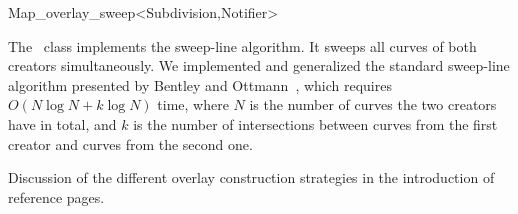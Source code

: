 
\ccRefPageBegin


\renewcommand{\ccRefPageBegin}{\begin{ccAdvanced}}
\renewcommand{\ccRefPageEnd}{\end{ccAdvanced}}

\begin{ccRefClass}{Map_overlay_sweep<Subdivision,Notifier>}
\label{OVL_sec:sweep_line}

The \ccRefName\ class implements the sweep-line algorithm.
It sweeps all curves of both creators simultaneously. 
We implemented and generalized the standard sweep-line algorithm 
presented by Bentley and Ottmann~\cite{bkos-cgaa-97}, which requires 
$O(N\log{N} + k\log{N})$ time, where $N$ is the number of curves the two 
creators have in total, and $k$ is the number of intersections between curves 
from the first creator and curves from the second one.


\ccIsModel

\ccInheritsFrom

\ccSeeAlso
   Discussion of the different overlay construction strategies in the introduction
of  reference pages.

\end{ccRefClass}
\renewcommand{\ccRefPageBegin}{}
\renewcommand{\ccRefPageEnd}{}


\ccRefPageEnd
